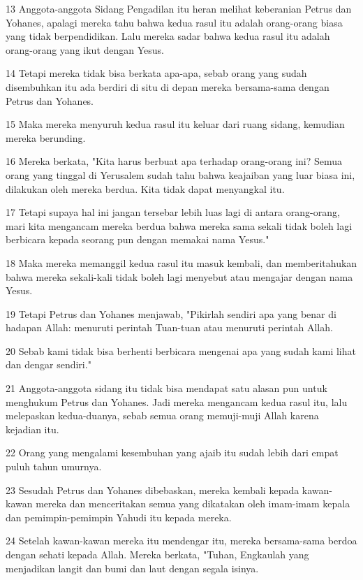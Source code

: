 \par 13 Anggota-anggota Sidang Pengadilan itu heran melihat keberanian Petrus dan Yohanes, apalagi mereka tahu bahwa kedua rasul itu adalah orang-orang biasa yang tidak berpendidikan. Lalu mereka sadar bahwa kedua rasul itu adalah orang-orang yang ikut dengan Yesus.
\par 14 Tetapi mereka tidak bisa berkata apa-apa, sebab orang yang sudah disembuhkan itu ada berdiri di situ di depan mereka bersama-sama dengan Petrus dan Yohanes.
\par 15 Maka mereka menyuruh kedua rasul itu keluar dari ruang sidang, kemudian mereka berunding.
\par 16 Mereka berkata, "Kita harus berbuat apa terhadap orang-orang ini? Semua orang yang tinggal di Yerusalem sudah tahu bahwa keajaiban yang luar biasa ini, dilakukan oleh mereka berdua. Kita tidak dapat menyangkal itu.
\par 17 Tetapi supaya hal ini jangan tersebar lebih luas lagi di antara orang-orang, mari kita mengancam mereka berdua bahwa mereka sama sekali tidak boleh lagi berbicara kepada seorang pun dengan memakai nama Yesus."
\par 18 Maka mereka memanggil kedua rasul itu masuk kembali, dan memberitahukan bahwa mereka sekali-kali tidak boleh lagi menyebut atau mengajar dengan nama Yesus.
\par 19 Tetapi Petrus dan Yohanes menjawab, "Pikirlah sendiri apa yang benar di hadapan Allah: menuruti perintah Tuan-tuan atau menuruti perintah Allah.
\par 20 Sebab kami tidak bisa berhenti berbicara mengenai apa yang sudah kami lihat dan dengar sendiri."
\par 21 Anggota-anggota sidang itu tidak bisa mendapat satu alasan pun untuk menghukum Petrus dan Yohanes. Jadi mereka mengancam kedua rasul itu, lalu melepaskan kedua-duanya, sebab semua orang memuji-muji Allah karena kejadian itu.
\par 22 Orang yang mengalami kesembuhan yang ajaib itu sudah lebih dari empat puluh tahun umurnya.
\par 23 Sesudah Petrus dan Yohanes dibebaskan, mereka kembali kepada kawan-kawan mereka dan menceritakan semua yang dikatakan oleh imam-imam kepala dan pemimpin-pemimpin Yahudi itu kepada mereka.
\par 24 Setelah kawan-kawan mereka itu mendengar itu, mereka bersama-sama berdoa dengan sehati kepada Allah. Mereka berkata, "Tuhan, Engkaulah yang menjadikan langit dan bumi dan laut dengan segala isinya.
